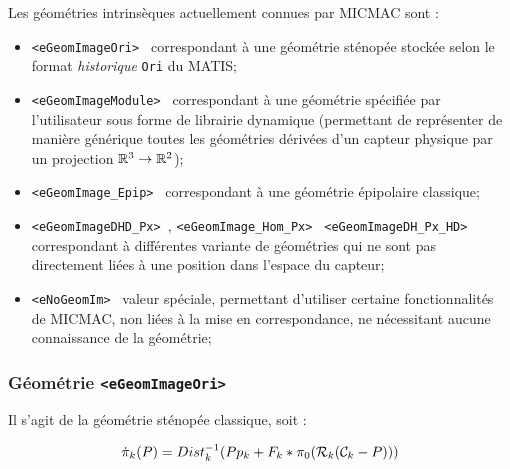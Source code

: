 \label{DuMeca:Geom:IntrinGene}

Les g\'eom\'etries intrins\`eques actuellement connues par MICMAC sont :

\begin{itemize}
   \item     {\tt   <eGeomImageOri>        } correspondant \`a une g\'eom\'etrie
             st\'enop\'ee stock\'ee selon le format \emph{historique}  {\tt Ori}
             du MATIS;

   \item     {\tt   <eGeomImageModule>     } correspondant \`a une 
             g\'eom\'etrie  sp\'ecifi\'ee par l'utilisateur sous forme de 
             librairie dynamique (permettant de repr\'esenter de mani\`ere 
             g\'en\'erique toutes les   g\'eom\'etries d\'eriv\'ees d'un capteur
             physique par un projection $\RR^3 \rightarrow \RR^2$);

   \item     {\tt   <eGeomImage\_Epip>     } correspondant \`a une 
             g\'eom\'etrie \'epipolaire classique;

   \item     {\tt   <eGeomImageDHD\_Px>    }, {\tt   <eGeomImage\_Hom\_Px>  }
             {\tt   <eGeomImageDH\_Px\_HD> } correspondant \`a diff\'erentes
             variante de g\'eom\'etries qui ne sont pas directement li\'ees 
             \`a une position dans l'espace du capteur;

   \item     {\tt   <eNoGeomIm>            } valeur sp\'eciale, permettant 
             d'utiliser certaine fonctionnalit\'es de MICMAC, non li\'ees
             \`a la mise en correspondance,  ne n\'ecessitant aucune 
             connaissance de la g\'eom\'etrie;

\end{itemize}



\subsubsection{G\'eom\'etrie {\tt   <eGeomImageOri>}}

\label{GEOM:ORI}

Il s'agit de la g\'eom\'etrie st\'enop\'ee classique, soit :


\begin{equation}
   \PiI_k(P) =   Dist^{-1}_k(Pp_k+F_k*\pi_0(\mathcal{R}_k(\mathcal{C}_k -P)))
    \label{Eq:Geom:Ori}
\end{equation}

